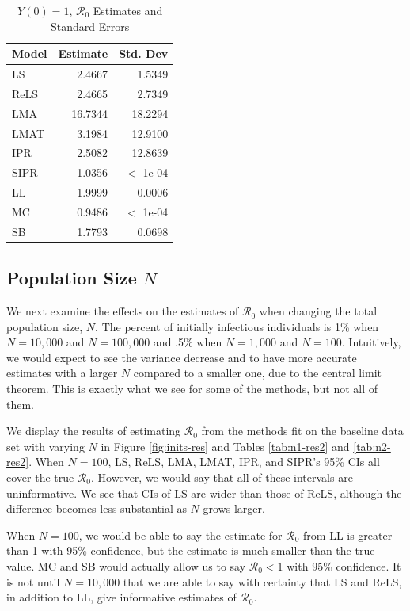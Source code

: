 \documentclass[12pt]{article}
\newcommand{\rr}{\ensuremath{\mathcal{R}_0}}
\begin{document}
\begin{table}[H]
	
	\centering
	\begin{tabular}[t]{l|r|r}
		\hline
		Model & Estimate & Std. Dev\\
		\hline
		LS & 2.4667 & 1.5349\\
		\hline
		ReLS & 2.4665 & 2.7349\\
		\hline
		LMA & 16.7344 & 18.2294\\
		\hline
		LMAT & 3.1984 & 12.9100\\
		\hline
		IPR & 2.5082 & 12.8639\\
		\hline
		SIPR & 1.0356 & $<$ 1e-04\\
		\hline
		LL & 1.9999 & 0.0006\\
		\hline
		MC & 0.9486 & $<$ 1e-04\\
		\hline
		SB & 1.7793 & 0.0698\\
		\hline
	\end{tabular}
	\caption{$Y(0) = 1$, $\rr$ Estimates and Standard Errors}
\end{table}


\subsection{Population Size $N$}\label{sec:res-n}
We next examine the effects on the estimates of $\rr$ when changing the total population size, $N$.  The percent of initially infectious individuals is 1\% when $N=10,000$ and $N=100,000$ and .5\% when $N=1,000$ and $N=100$. Intuitively, we would expect to see the variance decrease and to have more accurate estimates with a larger $N$ compared to a smaller one, due to the central limit theorem.  This is exactly what we see for some of the methods, but not all of them.

We display the results of estimating $\rr$ from the methods fit on the baseline data set with varying $N$ in Figure \ref{fig:inits-res} and Tables \ref{tab:n1-res2} and \ref{tab:n2-res2}.  When $N=100$, LS, ReLS, LMA, LMAT, IPR, and SIPR's 95\% CIs all cover the true $\rr$.  However, we would say that all of these intervals are uninformative.  We see that CIs of LS are wider than those of ReLS, although the difference becomes less substantial as $N$ grows larger.

When $N=100$, we would be able to say the estimate for $\rr$ from LL is greater than 1 with 95\% confidence, but the estimate is much smaller than the true value.  MC and SB would actually allow us to say $\rr < 1$ with 95\% confidence.  It is not until $N=10,000$ that we are able to say with certainty that LS and ReLS, in addition to LL, give informative estimates of $\rr$.
\end{document}

